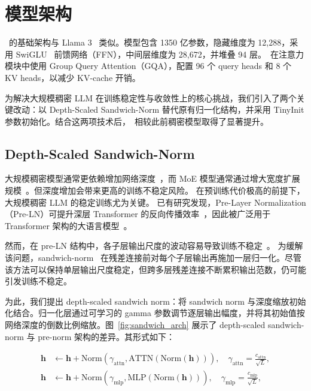\section{模型架构}

\modelname~的基础架构与 Llama 3~\cite{grattafiori2024llama} 类似。模型包含 1350 亿参数，隐藏维度为 12,288，采用 SwiGLU~\cite{shazeer2020glu} 前馈网络（FFN），中间层维度为 28,672，并堆叠 94 层。\modelname~在注意力模块中使用 Group Query Attention（GQA），配置 96 个 query heads 和 8 个 KV heads，以减少 KV-cache 开销。

为解决大规模稠密 LLM 在训练稳定性与收敛性上的核心挑战，我们引入了两个关键改动：以 Depth-Scaled Sandwich-Norm 替代原有归一化结构，并采用 TinyInit 参数初始化。结合这两项技术后，\modelname~相较此前稠密模型取得了显著提升。


\subsection{Depth-Scaled Sandwich-Norm}

大规模稠密模型通常更依赖增加网络深度~\cite{dubey2024llama}，而 MoE 模型通常通过增大宽度扩展规模~\cite{deepseekv3}。但深度增加会带来更高的训练不稳定风险。
在预训练代价极高的前提下，大规模稠密 LLM 的稳定训练尤为关键。
已有研究发现，Pre-Layer Normalization（Pre-LN）可提升深层 Transformer 的反向传播效率~\cite{wang2019learning-deep}，因此被广泛用于 Transformer 架构的大语言模型~\cite{dubey2024llama,bai2023qwen,deepseekv3}。

然而，在 pre-LN 结构中，各子层输出尺度的波动容易导致训练不稳定~\cite{takase2024spikemore}。
为缓解该问题，sandwich-norm~\cite{NEURIPS2021_CogView} 在残差连接前对每个子层输出再施加一层归一化。尽管该方法可以保持单层输出尺度稳定，但跨多层残差连接不断累积输出范数，仍可能引发训练不稳定。

为此，我们提出 depth-scaled sandwich norm：将 sandwich norm 与深度缩放初始化结合。归一化层通过可学习的 gamma 参数调节逐层输出幅度，并将其初始值按网络深度的倒数比例缩放。图~\ref{fig:sandwich_arch} 展示了 depth-scaled sandwich-norm 与 pre-norm 架构的差异。其形式如下：


\begin{equation} \label{eq:sandwich}
\begin{aligned}
    \mathbf{h} &\leftarrow \mathbf{h} + {\text{Norm}}({\gamma_{\text{attn}}}, \text{ATTN}(\text{Norm}(\mathbf{h}))), \quad  \gamma_{\text{attn}} = \frac{c_{\text{attn}}}{\sqrt{L}},\\ 
    \mathbf{h} &\leftarrow \mathbf{h} + {\text{Norm}}({\gamma_{\text{mlp}}}, \text{MLP}(\text{Norm}(\mathbf{h}))), \quad \gamma_{\text{mlp}} = \frac{c_{\text{mlp}}}{\sqrt{L}}, \\
\end{aligned}
\end{equation}



